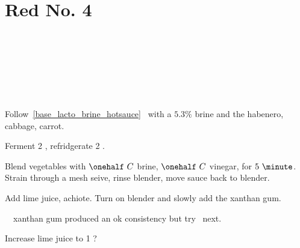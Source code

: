 \section[Red No. 4]{Red No. 4}

\begin{recipestats}[
        servings=12 \fluidounce,
        preptime=1 \hour,
        bakingtime=4 \week,
        source=Teresi Family,
    ]
\end{recipestats}

\begin{ingredientcolumns}[1]
    \begin{ingredientblock}
        \\
        \\
        \\
    \end{ingredientblock}
    \begin{ingredientblock}
        \\
        \\
    \end{ingredientblock}
\end{ingredientcolumns}

\begin{preparation}
\item Follow~\ref{base_lacto_brine_hotsauce}~ with a $5.3\%$ brine and the
    habenero, cabbage, carrot.

\item Ferment 2 \week, refridgerate 2 \week.

\item Blend vegetables with $\onehalf~C$ brine, $\onehalf~C$ vinegar, for $5~\minute$.
    Strain through a mesh seive, rinse blender, move sauce back to blender.

\item Add lime juice, achiote.
    Turn on blender and slowly add the xanthan gum.
\end{preparation}

\begin{experiments}
\item \onefourth~\teaspoon~xanthan gum produced an ok consistency but try \oneeighth~next.

\item Increase lime juice to 1 \ounce?
\end{experiments}

\recipeend%
